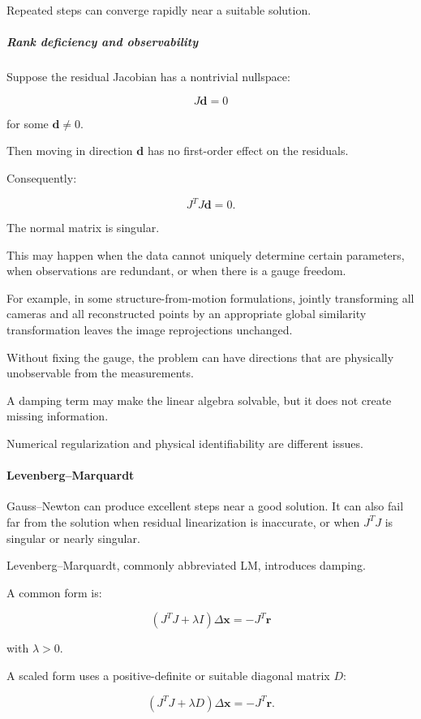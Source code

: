 Repeated steps can converge rapidly near a suitable solution.

\subparagraph{Rank deficiency and observability}\label{rank-deficiency-and-observability}

Suppose the residual Jacobian has a nontrivial nullspace:

\[
J\mathbf d=0
\]

for some \(\mathbf d\ne0\).

Then moving in direction \(\mathbf d\) has no first-order effect on the residuals.

Consequently:

\[
J^TJ\mathbf d=0.
\]

The normal matrix is singular.

This may happen when the data cannot uniquely determine certain parameters, when observations are redundant, or when there is a gauge freedom.

For example, in some structure-from-motion formulations, jointly transforming all cameras and all reconstructed points by an appropriate global similarity transformation leaves the image reprojections unchanged.

Without fixing the gauge, the problem can have directions that are physically unobservable from the measurements.

A damping term may make the linear algebra solvable, but it does not create missing information.

Numerical regularization and physical identifiability are different issues.

\paragraph{Levenberg--Marquardt}\label{levenbergmarquardt}

Gauss--Newton can produce excellent steps near a good solution. It can also fail far from the solution when residual linearization is inaccurate, or when \(J^TJ\) is singular or nearly singular.

Levenberg--Marquardt, commonly abbreviated LM, introduces damping.

A common form is:

\[
\boxed{ (J^TJ+\lambda I)\Delta\mathbf x=-J^T\mathbf r }
\]

with \(\lambda>0\).

A scaled form uses a positive-definite or suitable diagonal matrix \(D\):

\[
\boxed{ (J^TJ+\lambda D)\Delta\mathbf x=-J^T\mathbf r. }
\]

